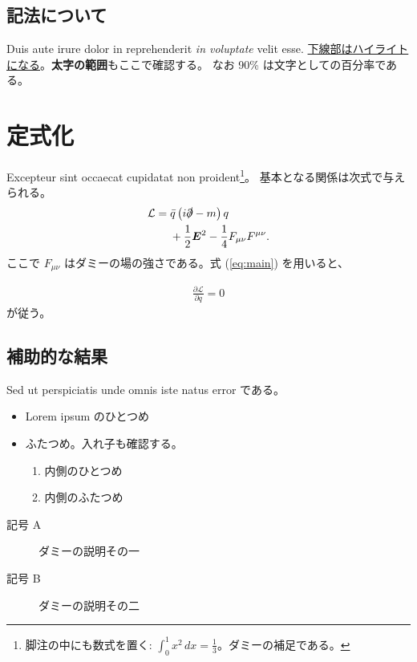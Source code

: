 \documentclass[a4j,11pt]{jarticle}
\numberwithin{equation}{section}
\newcommand{\pd}[2]{\frac{\partial #1}{\partial #2}}
\begin{document}
\subsection{記法について}
Duis aute irure dolor in reprehenderit \emph{in voluptate} velit esse.
\underline{下線部はハイライトになる}。{\bf 太字の範囲}もここで確認する。
なお 90\% は文字としての百分率である。  %

\section{定式化}
Excepteur sint occaecat cupidatat non proident\footnote{脚注の中にも数式を置く:
$\int_0^1 x^2\,dx = \frac{1}{3}$。ダミーの補足である。}。
基本となる関係は次式で与えられる。
\begin{align}
&\mathcal{L} = \bar{q}\left(i\slashed{\partial} - m\right)q \nonumber \\
&\qquad + \frac{1}{2}\bm{E}^2 - \frac{1}{4}F_{\mu\nu}F^{\mu\nu}. \label{eq:main}
\end{align}
ここで $F_{\mu\nu}$ はダミーの場の強さである。式 (\ref{eq:main}) を用いると、

\begin{align}
\pd{\mathcal{L}}{q} = 0
\end{align}
が従う。

\subsection{補助的な結果}
\begin{theorem}[ダミーの定理]
Sed ut perspiciatis unde omnis iste natus error である。
\end{theorem}

\begin{itemize}
\item Lorem ipsum のひとつめ
\item ふたつめ。入れ子も確認する。
  \begin{enumerate}
  \item 内側のひとつめ
  \item 内側のふたつめ
  \end{enumerate}
\end{itemize}

\begin{description}
\item[記号 A] ダミーの説明その一
\item[記号 B] ダミーの説明その二
\end{description}
\end{document}
